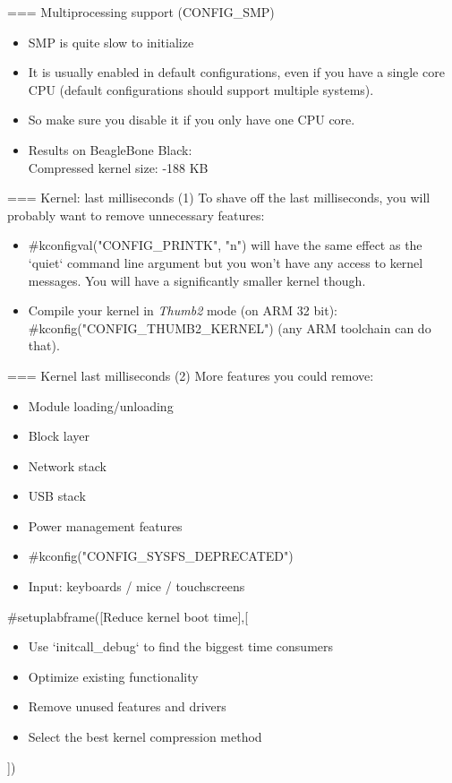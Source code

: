 === Multiprocessing support (CONFIG\_SMP)
  \begin{itemize}
          \item SMP is quite slow to initialize
          \item It is usually enabled in default configurations, even if
                you have a single core CPU (default configurations
                should support multiple systems).
          \item So make sure you disable it if you only have one CPU
                core.
          \item Results on BeagleBone Black:\\
                Compressed kernel size: -188 KB
  \end{itemize}



=== Kernel: last milliseconds (1)
To shave off the last milliseconds, you will probably want to remove unnecessary features:
\begin{itemize}
        \item #kconfigval("CONFIG_PRINTK", "n") will have the same effect as the
              `quiet` command line argument but you won't have
	      any access to kernel messages. You will have a
              significantly smaller kernel though.
	\item Compile your kernel in {\em Thumb2} mode (on ARM 32 bit):
	      #kconfig("CONFIG_THUMB2_KERNEL") (any ARM toolchain can do
	      that).
\end{itemize}


=== Kernel last milliseconds (2)
More features you could remove:
\begin{itemize}
        \item Module loading/unloading
        \item Block layer
        \item Network stack
        \item USB stack
        \item Power management features
        \item #kconfig("CONFIG_SYSFS_DEPRECATED")
        \item Input: keyboards / mice / touchscreens
\end{itemize}


#setuplabframe([Reduce kernel boot time],[
\begin{itemize}
\item Use `initcall_debug` to find the biggest
      time consumers
\item Optimize existing functionality
\item Remove unused features and drivers
\item Select the best kernel compression method
\end{itemize}
])

